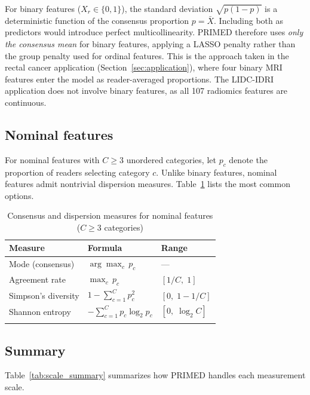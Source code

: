 \documentclass[referee,lineno,pdflatex,sn-vancouver-num]{sn-jnl}
\begin{document}
\begin{appendices}
For binary features ($X_r \in \{0,1\}$), the standard deviation $\sqrt{p(1-p)}$ is a deterministic function of the consensus proportion $p = \bar X$.
Including both as predictors would introduce perfect multicollinearity.
PRIMED therefore uses \emph{only the consensus mean} for binary features, applying a LASSO penalty rather than the group penalty used for ordinal features.
This is the approach taken in the rectal cancer application (Section~\ref{sec:application}), where four binary MRI features enter the model as reader-averaged proportions.
The LIDC-IDRI application does not involve binary features, as all 107 radiomics features are continuous.

\subsection{Nominal features}\label{secA5}

For nominal features with $C \geq 3$ unordered categories, let $p_c$ denote the proportion of readers selecting category $c$.
Unlike binary features, nominal features admit nontrivial dispersion measures.
Table~\ref{tab:nominal_measures} lists the most common options.

\begin{table}[h]
\caption{Consensus and dispersion measures for nominal features ($C \geq 3$ categories)}\label{tab:nominal_measures}
\small
\renewcommand{\arraystretch}{1.3}
\begin{tabular*}{\textwidth}{@{\extracolsep\fill}lll}
\toprule
Measure & Formula & Range \\
\midrule
Mode (consensus) & $\arg\max_c\, p_c$ & --- \\
Agreement rate & $\max_c\, p_c$ & $[1/C,\; 1]$ \\
Simpson's diversity & $1 - \sum_{c=1}^C p_c^2$ & $[0,\; 1-1/C]$ \\
Shannon entropy & $-\sum_{c=1}^C p_c \log_2 p_c$ & $[0,\; \log_2 C]$ \\
\botrule
\end{tabular*}
\end{table}

\subsection{Summary}\label{secA6}

Table~\ref{tab:scale_summary} summarizes how PRIMED handles each measurement scale.


\end{appendices}
\end{document}
